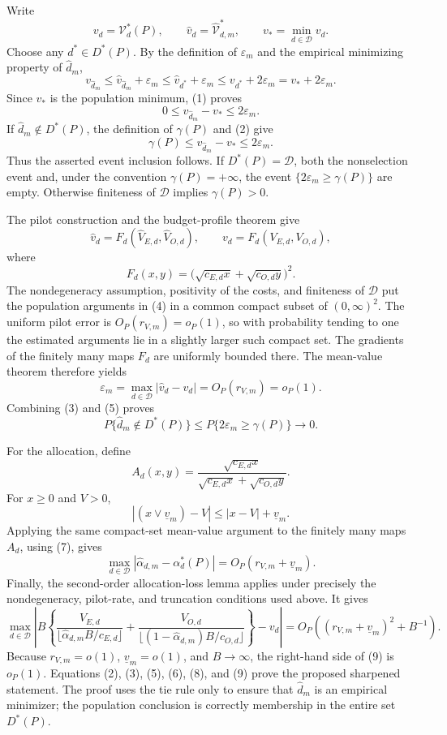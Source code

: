 Write
\[
 v_d=\mathcal V_d^*(P),\qquad
 \widehat v_d=\widehat{\mathcal V}_{d,m}^*,\qquad
 v_* = \min_{d\in\mathcal D}v_d.
\]
Choose any \(d^*\in D^*(P)\).  By the definition of \(\varepsilon_m\) and the empirical minimizing property of \(\widehat d_m\),
\[
 v_{\widehat d_m}
 \le \widehat v_{\widehat d_m}+\varepsilon_m
 \le \widehat v_{d^*}+\varepsilon_m
 \le v_{d^*}+2\varepsilon_m
 =v_*+2\varepsilon_m.                                           \tag{1}
\]
Since \(v_*\) is the population minimum, (1) proves
\[
 0\le v_{\widehat d_m}-v_*\le2\varepsilon_m.                    \tag{2}
\]
If \(\widehat d_m\notin D^*(P)\), the definition of \(\gamma(P)\) and (2) give
\[
 \gamma(P)\le v_{\widehat d_m}-v_*\le2\varepsilon_m.           \tag{3}
\]
Thus the asserted event inclusion follows.  If \(D^*(P)=\mathcal D\), both the nonselection event and, under the convention \(\gamma(P)=+\infty\), the event \(\{2\varepsilon_m\ge\gamma(P)\}\) are empty.  Otherwise finiteness of \(\mathcal D\) implies \(\gamma(P)>0\).

The pilot construction and the budget-profile theorem give
\[
 \widehat v_d=F_d(\widehat V_{E,d},\widehat V_{O,d}),\qquad
 v_d=F_d(V_{E,d},V_{O,d}),
\]
where
\[
 F_d(x,y)=\bigl(\sqrt{c_{E,d}x}+\sqrt{c_{O,d}y}\bigr)^2.         \tag{4}
\]
The nondegeneracy assumption, positivity of the costs, and finiteness of \(\mathcal D\) put the population arguments in (4) in a common compact subset of \((0,\infty)^2\).  The uniform pilot error is \(O_P(r_{V,m})=o_P(1)\), so with probability tending to one the estimated arguments lie in a slightly larger such compact set.  The gradients of the finitely many maps \(F_d\) are uniformly bounded there.  The mean-value theorem therefore yields
\[
 \varepsilon_m
 =\max_{d\in\mathcal D}|\widehat v_d-v_d|
 =O_P(r_{V,m})=o_P(1).                                           \tag{5}
\]
Combining (3) and (5) proves
\[
 P\{\widehat d_m\notin D^*(P)\}
 \le P\{2\varepsilon_m\ge\gamma(P)\}\longrightarrow0.       \tag{6}
\]

For the allocation, define
\[
 A_d(x,y)=
 \frac{\sqrt{c_{E,d}x}}
 {\sqrt{c_{E,d}x}+\sqrt{c_{O,d}y}}.
\]
For \(x\ge0\) and \(V>0\),
\[
 |(x\vee\underline v_m)-V|\le |x-V|+\underline v_m.            \tag{7}
\]
Applying the same compact-set mean-value argument to the finitely many maps \(A_d\), using (7), gives
\[
 \max_{d\in\mathcal D}
 |\widehat\alpha_{d,m}-\alpha_d^*(P)|
 =O_P(r_{V,m}+\underline v_m).                                   \tag{8}
\]
Finally, the second-order allocation-loss lemma applies under precisely the nondegeneracy, pilot-rate, and truncation conditions used above.  It gives
\[
\max_{d\in\mathcal D}\left|
B\left\{
\frac{V_{E,d}}{\lfloor\widehat\alpha_{d,m}B/c_{E,d}\rfloor}
+\frac{V_{O,d}}{\lfloor(1-\widehat\alpha_{d,m})B/c_{O,d}\rfloor}
\right\}-v_d\right|
=O_P\!\left((r_{V,m}+\underline v_m)^2+B^{-1}\right).          \tag{9}
\]
Because \(r_{V,m}=o(1)\), \(\underline v_m=o(1)\), and \(B\to\infty\), the right-hand side of (9) is \(o_P(1)\).  Equations (2), (3), (5), (6), (8), and (9) prove the proposed sharpened statement.  The proof uses the tie rule only to ensure that \(\widehat d_m\) is an empirical minimizer; the population conclusion is correctly membership in the entire set \(D^*(P)\).